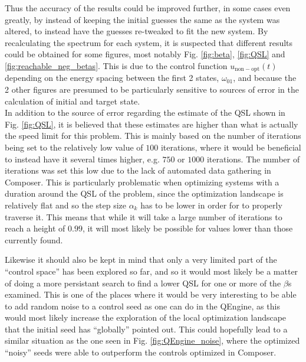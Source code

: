 \documentclass[a4paper, twocolumn]{revtex4-1}
\begin{document}
Thus the accuracy of the results could be improved further, in some cases even greatly, by instead of keeping the initial guesses the same as the system was altered, to instead have the guesses re-tweaked to fit the new system. By recalculating the spectrum for each system, it is suspected that different results could be obtained for some figures, most notably Fig. \ref{fig:beta}, \ref{fig:QSL} and \ref{fig:reachable_neg_betas}. This is due to the control function $u_{\mathrm{non-opt}}(t)$ depending on the energy spacing between the first 2 states, $\omega_{01}$, and because the 2 other figures are presumed to be particularly sensitive to sources of error in the calculation of initial and target state.   \\

In addition to the source of error regarding the estimate of the QSL shown in Fig. \ref{fig:QSL}, it is believed that these estimates are higher than what is actually the speed limit for this problem. This is mainly based on the number of  iterations being set to the relatively low value of $100$ iterations, where it would be beneficial to instead have it several times higher, e.g. $750$ or $1000$ iterations. The number of iterations was set this low due to the lack of automated data gathering in Composer. This is particularly problematic when optimizing systems with a duration around the QSL of the problem, since the optimization landscape is relatively flat and so the step size $\alpha_k$ has to be lower in order for  to properly traverse it. This means that while it will take a large number of iterations to reach a height of $0.99$, it will most likely be possible for values lower than those currently found. 

Likewise it should also be kept in mind that only a very limited part of the ``control space'' has been explored so far, and so it would most likely be a matter of doing a more persistant search to find a lower QSL for one or more of the $\beta$s examined. This is one of the places where it would be very interesting to be able to add random noise to a control seed as one can do in the QEngine, as this would most likely increase the exploration of the local optimization landscape that the initial seed has ``globally'' pointed out. This could hopefully lead to a similar situation as the one seen in Fig. \ref{fig:QEngine_noise}, where the optimized ``noisy'' seeds were able to outperform the controls optimized in Composer.\\
\end{document}
